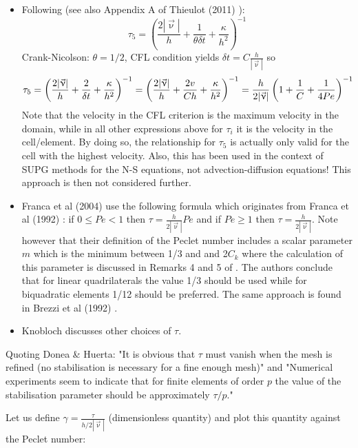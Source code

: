 \begin{itemize}
\item Following \cite{teos00} (see also Appendix A of Thieulot (2011) \cite{thie11}):
\[
\tau_5 = \left( \frac{2 |\vec{\upnu}|}{h} + \frac{1}{\theta \delta t} + \frac{\kappa}{h^2} \right)^{-1}  
\]
Crank-Nicolson: $\theta=1/2$, CFL condition yields $\delta t = C \frac{h}{|\vec\upnu|}$ so 
\[
\tau_5 = \left( \frac{2 |\vec{\upnu}|}{h} + \frac{2}{\delta t}+  \frac{\kappa}{h^2}  \right)^{-1}  
= \left( \frac{2 |\vec{\upnu}|}{h} + \frac{2 v}{C h} +  \frac{\kappa}{h^2}  \right)^{-1}  
= \frac{h}{2 |\vec{\upnu}|}  \left( 1 + \frac{1}{C} + \frac{1}{4 Pe} \right)^{-1} \nonumber 
\]
Note that the velocity in the CFL criterion is the maximum velocity in the domain, while 
in all other expressions above for $\tau_i$ it is the velocity in the cell/element. 
By doing so, the relationship  for $\tau_5$ is actually only valid for the cell with the 
highest velocity. 
Also, this has been used in the context of SUPG methods for the N-S equations, not advection-diffusion
equations! This approach is then not considered further.

\item Franca et al (2004) \cite{frhm04} use the following formula which originates from 
Franca et al (1992) \cite{frfh92}: if $0\le Pe < 1$ then
$\tau = \frac{h}{2 |\vec\upnu|} Pe$ and if $Pe \ge 1$ then $\tau = \frac{h}{2 |\vec\upnu|}$.
Note however that their definition of the Peclet number includes a scalar parameter $m$ which is 
the minimum between 1/3 and and 2$C_k$ where the calculation of this parameter is discussed in 
Remarks 4 and 5 of \cite{frfh92}. The authors conclude that for linear quadrilaterals the value
1/3 should be used while for biquadratic elements 1/12 should be preferred.
The same approach is found in Brezzi et al (1992) \cite{brbf92}. 

\item Knobloch \cite{knob08} discusses other choices of $\tau$.

\end{itemize}

Quoting Donea \& Huerta: "It is obvious that $\tau$ must vanish when the mesh is refined (no stabilisation
is necessary for a fine enough mesh)" and "Numerical experiments seem to indicate that for 
finite elements of order $p$ the value of the stabilisation parameter should be approximately 
$\tau/p$."

Let us define $\gamma=\frac{\tau}{h/2|\vec\upnu|}$ (dimensionless quantity) and 
plot this quantity against the Peclet number:

